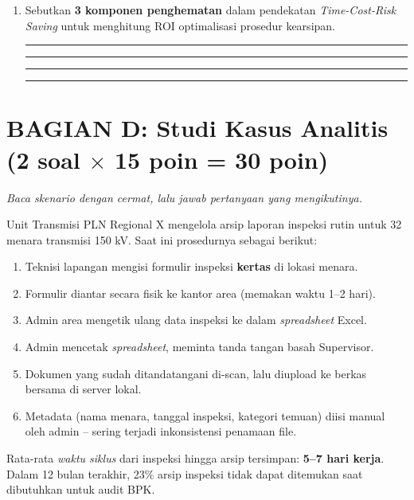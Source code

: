 \documentclass[12pt,a4paper]{report}
\begin{document}
\begin{enumerate}[leftmargin=*, itemsep=0.3cm]
\vspace{0.2cm}
\noindent\rule{\textwidth}{0.3pt}
\vspace{0.5cm}
\noindent\rule{\textwidth}{0.3pt}
\vspace{0.5cm}
\noindent\rule{\textwidth}{0.3pt}
\vspace{0.5cm}
\noindent\rule{\textwidth}{0.3pt}

\item Sebutkan \textbf{3 komponen penghematan} dalam pendekatan \textit{Time-Cost-Risk Saving} untuk menghitung ROI optimalisasi prosedur kearsipan.

\vspace{0.2cm}
\noindent\rule{\textwidth}{0.3pt}
\vspace{0.5cm}
\noindent\rule{\textwidth}{0.3pt}
\vspace{0.5cm}
\noindent\rule{\textwidth}{0.3pt}
\vspace{0.5cm}
\noindent\rule{\textwidth}{0.3pt}

\end{enumerate}

\newpage
\section{BAGIAN D: Studi Kasus Analitis (2 soal $\times$ 15 poin = 30 poin)}
\textit{Baca skenario dengan cermat, lalu jawab pertanyaan yang mengikutinya.}

\vspace{0.3cm}

\begin{plnbox}
\small
Unit Transmisi PLN Regional X mengelola arsip laporan inspeksi rutin untuk 32 menara transmisi 150 kV. Saat ini prosedurnya sebagai berikut:
\begin{enumerate}[nosep]
    \item Teknisi lapangan mengisi formulir inspeksi \textbf{kertas} di lokasi menara.
    \item Formulir diantar secara fisik ke kantor area (memakan waktu 1--2 hari).
    \item Admin area mengetik ulang data inspeksi ke dalam \textit{spreadsheet} Excel.
    \item Admin mencetak \textit{spreadsheet}, meminta tanda tangan basah Supervisor.
    \item Dokumen yang sudah ditandatangani di-scan, lalu diupload ke berkas bersama di server lokal.
    \item Metadata (nama menara, tanggal inspeksi, kategori temuan) diisi manual oleh admin -- sering terjadi inkonsistensi penamaan file.
\end{enumerate}
Rata-rata \textit{waktu siklus} dari inspeksi hingga arsip tersimpan: \textbf{5--7 hari kerja}. Dalam 12 bulan terakhir, 23\% arsip inspeksi tidak dapat ditemukan saat dibutuhkan untuk audit BPK.
\end{plnbox}
\end{document}
